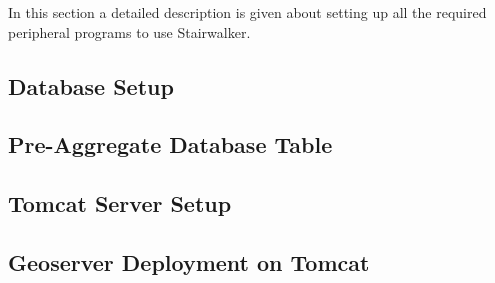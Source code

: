 In this section a detailed description is given about setting up all the
required peripheral programs to use Stairwalker.

\subsection{Database Setup}


\subsection{Pre-Aggregate Database Table}


\subsection{Tomcat Server Setup}

\label{sec:tomcat}

\subsection{Geoserver Deployment on Tomcat}

\label{sec:geoserverinstall}
